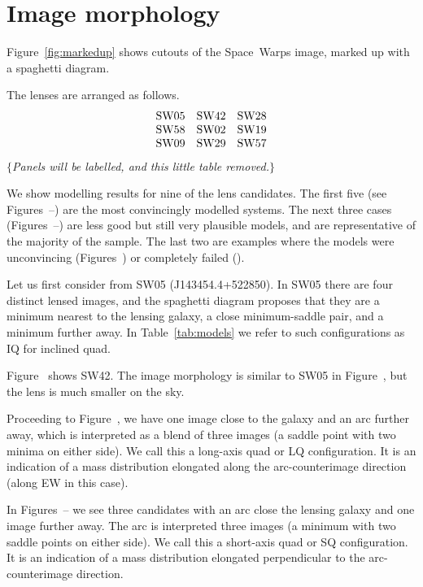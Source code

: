 \section{Image morphology}

Figure~\ref{fig:markedup} shows cutouts of the Space~Warps image,
marked up with a spaghetti diagram.

The lenses are arranged as follows.
$$
\begin{matrix}
\rm SW05 & \rm SW42 & \rm SW28 \\
\rm SW58 & \rm SW02 & \rm SW19 \\
\rm SW09 & \rm SW29 & \rm SW57
\end{matrix}
$$ 
$\{${\em Panels will be labelled, and this little table removed.}$\}$

We show modelling results for nine of the lens candidates.  The first
five (see Figures~--) are the most
convincingly modelled systems.  The next three cases
(Figures~--) are less good but still very
plausible models, and are representative of the majority of the
sample.  The last two are examples where the models were unconvincing
(Figures~) or completely failed ().


Let us first consider from SW05 (J143454.4+522850).
In SW05 there are four distinct lensed images, and the spaghetti
diagram proposes that they are a minimum nearest to the lensing
galaxy, a close minimum-saddle pair, and a minimum further away. In
Table~\ref{tab:models} we refer to such configurations as IQ for
inclined quad.

Figure~ shows SW42.  The image morphology is similar to
SW05 in Figure~, but the lens is much smaller on the sky.

Proceeding to Figure~, we have one image close to the
galaxy and an arc further away, which is interpreted as a blend of
three images (a saddle point with two minima on either side).  We call
this a long-axis quad or LQ configuration.  It is an indication of a
mass distribution elongated along the arc-counterimage direction
(along EW in this case).

In Figures~-- we see three candidates with
an arc close the lensing galaxy and one image further away.  The arc
is interpreted three images (a minimum with two saddle points on
either side).  We call this a short-axis quad or SQ configuration.  It
is an indication of a mass distribution elongated perpendicular to the
arc-counterimage direction.



\begin{figure*}
\caption{Marked-up images. \label{fig:markedup}}
\end{figure*}

